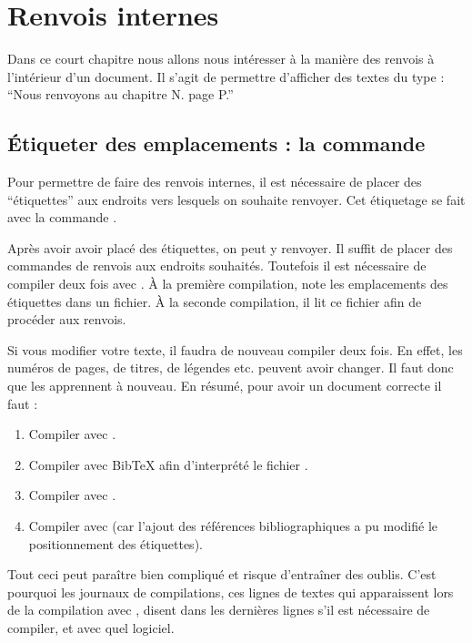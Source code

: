 \chapter{Renvois internes}\label{label}

\begin{prealable}
Dans ce court chapitre nous allons nous intéresser à la manière des renvois à l'intérieur d'un document.
Il s'agit de permettre d'afficher des textes du type : \enquote{Nous renvoyons au chapitre N. page P.}
\end{prealable}

\section{Étiqueter des  emplacements : la commande }

Pour permettre de faire des renvois internes, il est nécessaire de placer des \enquote{étiquettes} aux endroits vers lesquels on souhaite renvoyer.
Cet étiquetage  se fait avec la commande .




Après avoir avoir placé des étiquettes, on peut y renvoyer. 
Il suffit de placer des commandes de renvois aux endroits souhaités. 
Toutefois il est nécessaire de compiler deux fois avec \XeLaTeX{}.
À la première compilation,   \XeLaTeX{}%
note les emplacements des étiquettes dans un fichier. À la seconde compilation, il lit ce fichier afin de procéder aux renvois. 

\begin{attention}
	Si vous modifier votre texte, il faudra de nouveau compiler deux fois. En effet, les numéros de pages, de titres, de légendes etc. peuvent avoir changer. Il faut donc  que \XeLaTeX{} les apprennent à nouveau. En résumé, pour avoir un document correcte il faut :
	\begin{enumerate}
		\item Compiler avec \XeLaTeX{}.
		\item Compiler avec BibTeX afin d'interprété le fichier .
		\item Compiler avec \XeLaTeX{}.
		\item Compiler avec \XeLaTeX{} (car l'ajout des références bibliographiques a pu modifié le positionnement des étiquettes).
	\end{enumerate}
	
	Tout ceci peut paraître bien compliqué et risque d'entraîner des oublis. C'est pourquoi les journaux de compilations, ces lignes de textes qui apparaissent lors de la compilation avec \XeLaTeX{}, disent dans les dernières lignes s'il est nécessaire de compiler, et avec quel logiciel.
\end{attention}

